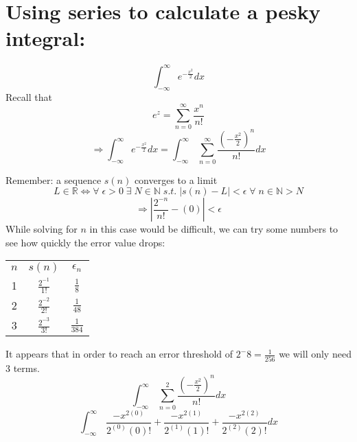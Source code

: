 \documentclass{article}
\begin{document}
\section{Using series to calculate a pesky integral:}
    \[\int _{-\infty }^{\infty \:}e^{-\frac{x^2}{2}}dx\]
    Recall that
    \[e^z= \sum_{n=0}^{\infty}\frac{x^n}{n!}\]
    \[\Rightarrow \int _{-\infty }^{\infty \:}e^{-\frac{x^2}{2}}dx=\int _{-\infty \:}^{\infty \:\:}\sum_{n=0}^{\infty}\frac{(-\frac{x^2}{2})^n}{n!} dx \]

    Remember: a sequence $s(n)$ converges to a limit
    \[L \in\mathbb{R}\iff\forall \; \epsilon > 0  \; \exists \; N \in \mathbb{N} \; s.t. \; |s(n) - L| < \epsilon \; \forall \; n \in \mathbb{N} > N\]
    \[ \Rightarrow |\frac{2^{-n}}{n!} - (0)| < \epsilon\]
    While solving for $n$ in this case would be difficult, we can try some numbers to see how quickly the error value drops:
    \begin{center}
     \begin{tabular}{||c | c | c||}
     \hline
     $n$ & $s(n)$ & $\epsilon_n$ \\ [0.5ex]
     1 & $\frac{2^{-1}}{1!}$ & $\frac{1}{8}$ \\
     2 & $\frac{2^{-2}}{2!}$ & $\frac{1}{48}$ \\
     3 & $\frac{2^{-3}}{3!}$ & $\frac{1}{384}$ \\ [1ex] 
     \hline
    \end{tabular}
    \end{center}
    It appears that in order to reach an error threshold of $2^-8 = \frac{1}{256}$ we will only need 3 terms.
    \[\int _{-\infty \:}^{\infty \:\:}\sum_{n=0}^{2}\frac{(-\frac{x^2}{2})^n}{n!} dx \]
    \[\int _{-\infty \:}^{\infty \:\:}\frac{-x^{2(0)}}{2^{(0)}(0)!}+\frac{-x^{2(1)}}{2^{(1)}(1)!}+\frac{-x^{2(2)}}{2^{(2)}(2)!} dx \]
\end{document}
